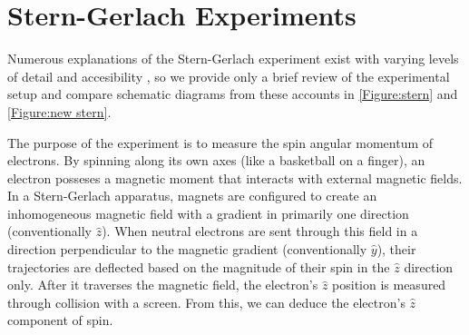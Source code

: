 %
%
%
%

\chapter{Stern-Gerlach Experiments}
Numerous explanations of the Stern-Gerlach experiment exist with varying levels of detail and accesibility \cite{mcintyre, bocking, rodriguez, stern}, so we provide only a brief review of the experimental setup and compare schematic diagrams from these accounts in  \autoref{Figure:stern} and \autoref{Figure:new stern}.

The purpose of the experiment is to measure the spin angular momentum of electrons. By spinning along its own axes (like a basketball on a finger), an electron posseses a magnetic moment that interacts with external magnetic fields. In a Stern-Gerlach apparatus, magnets are configured to create an inhomogeneous magnetic field with a gradient in primarily one direction (conventionally $\hat{z}$). When neutral electrons are sent through this field in a direction perpendicular to the magnetic gradient (conventionally $\hat{y}$), their trajectories are deflected based on the magnitude of their spin in the $\hat{z}$ direction only. After it traverses the magnetic field, the electron's $\hat{z}$ position is measured through collision with a screen. From this, we can deduce the electron's $\hat{z}$ component of spin.

